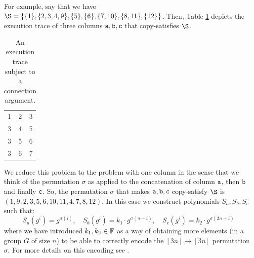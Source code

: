 
For example, say that we have $\S = \{ \{1\}, \{2,3,4,9\}, \{5\}, \{6\}, \{7,10\}, \{8,11\}, \{12\}\}$. Then, Table \ref{table:connection-arg-complex-example} depicts the execution trace of three columns $\mathtt{a},\mathtt{b},\mathtt{c}$ that copy-satisfies $\S$.
\begin{table}[H]
    \centering
    \begin{tabular}{|c|c|c|}
        \hline
        \att	&\btt	&\ctt	\\ \hline
        1	&2							&\cellcolor{cyan}3 						\\
        \cellcolor{cyan} 3	&4							&\cellcolor{pink} 5 	\\
        \cellcolor{cyan} 3	&\cellcolor{pink} 5			&\cellcolor{brown} 6 	\\
        \cellcolor{cyan} 3	&\cellcolor{brown}6			&7 						\\
        \hline
    \end{tabular}
    \caption{An execution trace subject to a connection argument. }
    \label{table:connection-arg-complex-example}
\end{table}
We reduce this problem to the problem with one column in the sense that we think of the permutation $\sigma$ as applied to the concatenation of column $\mathtt{a}$, then $\mathtt{b}$ and finally $\mathtt{c}$. So, the permutation $\sigma$ that makes $\mathtt{a},\mathtt{b},\mathtt{c}$ copy-satisfy $\S$ is $(1,9,2,3,5,6,10,11,4,7,8,12)$. In this case we construct polynomials $S_a, S_b,S_c$ such that:
\[
S_a(g^i) = g^{\sigma(i)}, \quad S_b(g^i) = k_1 \cdot g^{\sigma(n+i)}, \quad S_c(g^i) = k_2 \cdot g^{\sigma(2n+i)}
\]
where we have introduced $k_1,k_2 \in \mathbb{F}$ as a way of obtaining more elements (in a group $G$ of size $n$) to be able to correctly encode the $[3n] \to [3n]$ permutation $\sigma$. For more details on this encoding see \cite{EPRINT:GabWilCio19}.



